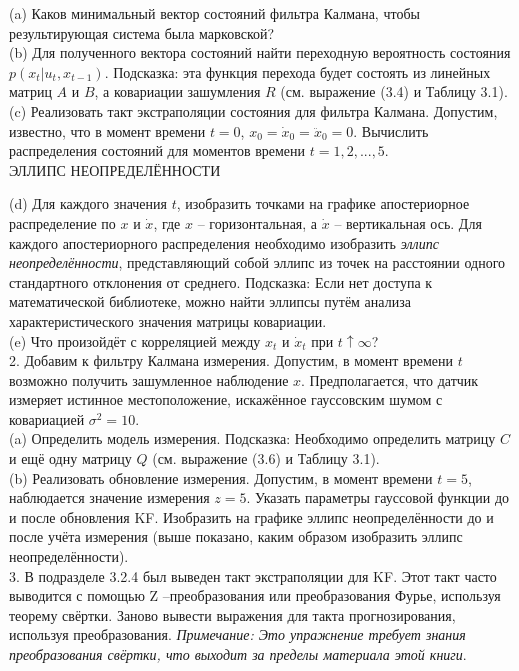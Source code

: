 \documentclass[10pt,a4paper]{article}
\begin{document}
(a) Каков минимальный вектор состояний фильтра Калмана, чтобы результирующая система была марковской?\\

(b) Для полученного вектора состояний найти переходную вероятность состояния $p(x_t | u_t,x_{t-1})$. Подсказка: эта функция перехода будет состоять из линейных матриц $A$ и $B$, а ковариации зашумления $R$ (см. выражение (3.4) и Таблицу 3.1).\\

(c) Реализовать такт экстраполяции состояния для фильтра Калмана. Допустим, известно, что в момент времени $t = 0$, $x_0 = \dot{x}_0 = \ddot{x}_0 =0$. Вычислить распределения состояний для моментов времени $t = 1, 2,..., 5$.\\

ЭЛЛИПС НЕОПРЕДЕЛЁННОСТИ

(d) Для каждого значения $t$, изобразить точками на графике апостериорное распределение по $x$ и $\dot{x}$, где $x$ – горизонтальная, а $\dot{x}$ – вертикальная ось. Для каждого апостериорного распределения необходимо изобразить \textit{эллипс неопределённости}, представляющий собой эллипс из точек на расстоянии одного стандартного отклонения от среднего. Подсказка: Если нет доступа к математической библиотеке, можно найти эллипсы путём анализа характеристического значения матрицы ковариации.\\

(e) Что произойдёт с корреляцией между $x_t$ и $\dot{x}_t$ при $t\uparrow\infty$?\\

2. Добавим к фильтру Калмана измерения. Допустим, в момент времени $t$ возможно получить зашумленное наблюдение $x$. Предполагается, что датчик измеряет истинное местоположение, искажённое гауссовским шумом с ковариацией $\sigma^2=10$.\\

(a) Определить модель измерения. Подсказка: Необходимо определить матрицу $C$ и ещё одну матрицу $Q$ (см. выражение (3.6) и Таблицу 3.1).\\

(b) Реализовать обновление измерения. Допустим, в момент времени $t = 5$, наблюдается значение измерения $z = 5$. Указать параметры гауссовой функции до и после обновления KF. Изобразить на графике эллипс неопределённости до и после учёта измерения (выше показано, каким образом изобразить эллипс неопределённости).\\
3. В подразделе 3.2.4 был выведен такт экстраполяции для KF. Этот такт часто выводится с помощью Z –преобразования или преобразования Фурье, используя теорему свёртки. Заново вывести выражения для такта прогнозирования, используя преобразования. \textit{Примечание: Это упражнение требует знания преобразования свёртки, что выходит за пределы материала этой книги}.\\
\end{document}
